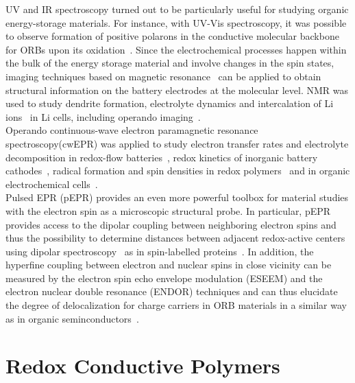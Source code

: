 \par UV and IR spectroscopy turned out to be particularly useful for studying organic energy-storage materials. For instance, with UV-Vis spectroscopy, it was possible to observe formation of positive polarons in the conductive molecular backbone for ORBs upon its oxidation~\cite{Dmitrieva2018}.
Since the electrochemical processes happen within the bulk of the energy storage material and involve changes in the spin states, imaging techniques based on magnetic resonance~\cite{Niemoller2018,Meier2013,Li2019,Bittl2005} can be applied to obtain structural information on the battery electrodes at the molecular level. NMR was used to study dendrite formation, electrolyte dynamics and intercalation of Li ions~\cite{Kushida1980,Grosu2023a} in Li cells, including operando imaging~\cite{Shi2019}.\\ 

Operando continuous-wave electron paramagnetic resonance spectroscopy(cwEPR) was applied to study electron transfer rates and electrolyte decomposition in redox-flow batteries~\cite{zhao2021_jacs}, redox kinetics of inorganic battery cathodes~\cite{Niemoller2019}, radical formation and spin densities in redox polymers~\cite{Dmitrieva2018} and in organic electrochemical cells~\cite{huang2016_jpowersources,Kulikov2022,kanzaki2018_acsappmat}.\\

Pulsed EPR (pEPR) provides an even more powerful toolbox for material studies with the electron spin as a microscopic structural probe. In particular, pEPR provides access to the dipolar coupling between neighboring electron spins and thus the possibility to determine distances between adjacent redox-active centers using dipolar spectroscopy~\cite{Salikhov1981} as in spin-labelled proteins~\cite{jeschke2012_annrevphyschem,Toropov1998}. In addition, the hyperfine coupling between electron and nuclear spins in close vicinity can be measured by the electron spin echo envelope modulation (ESEEM) and the electron nuclear double resonance (ENDOR) techniques and can thus elucidate the degree of delocalization for charge carriers in ORB materials in a similar way as in organic seminconductors~\cite{Behrends2011}.


\section{Redox Conductive Polymers}

